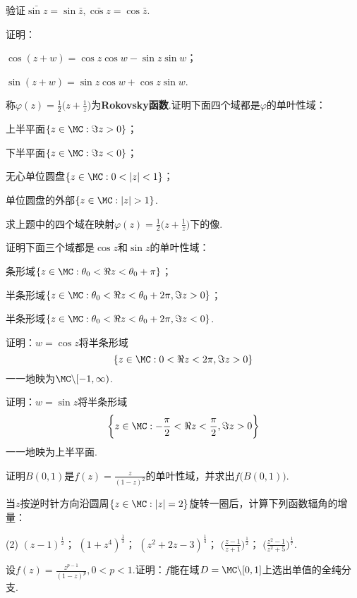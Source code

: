 \begin{xiti}
\item 验证$\bar{\sin z}=\sin\bar z,\bar{\cos z}=\cos\bar z$.
\item 证明：
\begin{enuma}
  \item $\cos(z+w)=\cos z\cos w-\sin z\sin w$；
  \item $\sin(z+w)=\sin z\cos w+\cos z\sin w$.
\end{enuma}
\item 称$\varphi(z)=\frac12\bigg(z+\frac1z\bigg)$为\textbf{Rokovsky函数}.证明下面四个域都是$\varphi$的单叶性域：
\begin{enuma}
  \item 上半平面$\{z\in\MC:\Im z>0\}$；
  \item 下半平面$\{z\in\MC:\Im z<0\}$；
  \item 无心单位圆盘$\{z\in\MC:0<|z|<1\}$；
  \item 单位圆盘的外部$\{z\in\MC:|z|>1\}$.
\end{enuma}
\item 求上题中的四个域在映射$\varphi(z)=\frac12\bigg(z+\frac1z\bigg)$下的像.
\item 证明下面三个域都是$\cos z$和$\sin z$的单叶性域：
\begin{enuma}
  \item 条形域$\{z\in\MC:\theta_0<\Re z<\theta_0+\pi\}$；
  \item 半条形域$\{z\in\MC:\theta_0<\Re z<\theta_0+2\pi,\Im z>0\}$；
  \item 半条形域$\{z\in\MC:\theta_0<\Re z<\theta_0+2\pi,\Im z<0\}$.
\end{enuma}
\item 证明：$w=\cos z$将半条形域
\[\{z\in\MC:0<\Re z<2\pi,\Im z>0\}\]
一一地映为$\MC\backslash[-1,\infty)$.
\item 证明：$w=\sin z$将半条形域
\[\bigg\{z\in\MC:-\frac\pi2<\Re z<\frac\pi2,\Im z>0\bigg\}\]
一一地映为上半平面.
\item 证明$B(0,1)$是$f(z)=\frac z{(1-z)^2}$的单叶性域，并求出$f\big(B(0,1)\big)$.
\item 当$z$按逆时针方向沿圆周$\{z\in\MC:|z|=2\}$旋转一圈后，计算下列函数辐角的增量：
\begin{tasks}(2)
  \task $(z-1)^{\frac12}$；
  \task $(1+z^4)^{\frac13}$；
  \task $(z^2+2z-3)^{\frac14}$；
  \task $\bigg(\frac{z-1}{z+1}\bigg)^{\frac12}$；
  \task $\bigg(\frac{z^2-1}{z^2+5}\bigg)^{\frac17}$.
\end{tasks}
\item 设$f(z)=\frac{z^{p-1}}{(1-z)^p},0<p<1$.证明：$f$能在域$D=\MC\backslash[0,1]$上选出单值的全纯分支.

\end{xiti}

